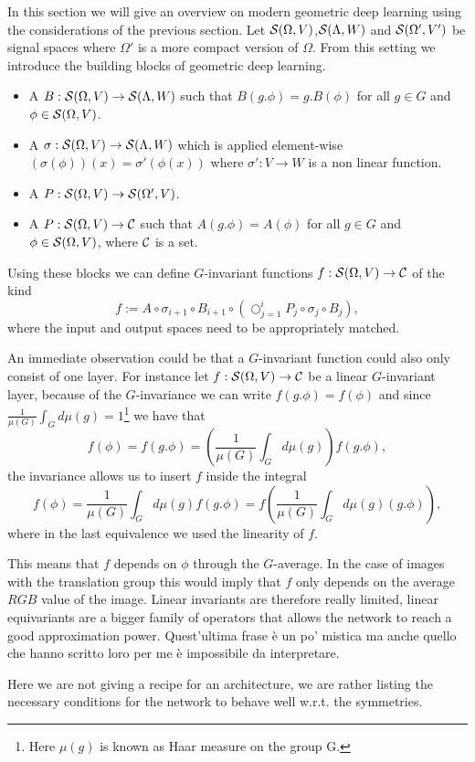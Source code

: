 \documentclass[../3.tex]{subfiles}
\begin{document}
    In this section we will give an overview on modern geometric deep learning using the considerations of the previous section.
    Let $\mathcal{S}(\Omega,V)$,$\mathcal{S}(\Lambda,W)$ and $\mathcal{S}(\Omega',V')$ be signal spaces where {\color{red} $\Omega'$ is a more compact version of $\Omega$}.
    From this setting we introduce the building blocks of geometric deep learning.

    \begin{itemize}
        \item A  $B : \mathcal{S}(\Omega,V) \to \mathcal{S}(\Lambda,W)$ such that
            $B(g.\phi) = g.B(\phi)$ for all $g \in G$ and $\phi \in \mathcal{S}(\Omega,V)$.
        \item A  $\sigma : \mathcal{S}(\Omega,V) \to \mathcal{S}(\Lambda,W)$ which is applied element-wise 
            $(\sigma(\phi))(x) = \sigma'(\phi(x))$ where $\sigma' : V \to W$ is a non linear function.
        \item A  $P : \mathcal{S}(\Omega,V) \to \mathcal{S}(\Omega',V)$.
        \item A  $P : \mathcal{S}(\Omega,V) \to \mathcal{C}$ such that $A(g.\phi) = A(\phi)$ for all $g \in G$ 
        and $\phi \in \mathcal{S}(\Omega,V)$, where $\mathcal{C}$ is a set.
    \end{itemize}

    Using these blocks we can define $G$-invariant functions $f : \mathcal{S}(\Omega,V) \to \mathcal{C}$ of the kind
    \[ f := A \circ \sigma_{i+1} \circ B_{i+1} \circ (\bigcirc_{j = 1}^i P_j \circ \sigma_j \circ B_j ) , \]
    where the input and output spaces need to be appropriately matched.

    An immediate observation could be that a $G$-invariant function could also only consist of one layer.
    For instance let $f : \mathcal{S}(\Omega,V) \to \mathcal{C}$ be a linear $G$-invariant layer, because of the $G$-invariance we can write
    $f(g.\phi) = f(\phi)$ and since $\frac{1}{\mu(G)} \int_G d\mu(g) = 1$\footnote{Here $\mu(g)$ is known as Haar measure on the group G.} we have that
    \[ f(\phi) = f(g.\phi) = (\frac{1}{\mu(G)} \int_G d\mu(g)) f(g.\phi),  \]
    the invariance allows us to insert $f$ inside the integral
    \[ f(\phi) = \frac{1}{\mu(G)} \int_G d\mu(g) f(g.\phi) = f(\frac{1}{\mu(G)} \int_G d\mu(g) (g.\phi)), \]
    where in the last equivalence we used the linearity of $f$.

    This means that $f$ depends on $\phi$ through the $G$-average.
    In the case of images with the translation group this would imply that $f$ only depends on the average $RGB$ value of the image.
    Linear invariants are therefore really limited, linear equivariants are a bigger family of operators that allows the network to reach a good approximation
    power.{\color{red} Quest'ultima frase è un po' mistica ma anche quello che hanno scritto loro per me è impossibile da interpretare.}
    
    Here we are not giving a recipe for an architecture, we are rather listing the necessary conditions for the network to behave well w.r.t. the symmetries.
\end{document}
